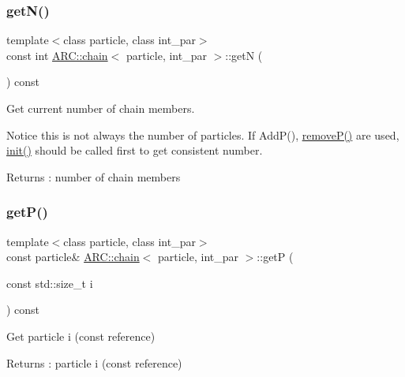 \subsubsection{\texorpdfstring{get\+N()}{getN()}}
{\footnotesize\ttfamily template$<$class particle, class int\+\_\+par$>$ \\
const int \hyperlink{classARC_1_1chain}{A\+R\+C\+::chain}$<$ particle, int\+\_\+par $>$\+::getN (\begin{DoxyParamCaption}{ }\end{DoxyParamCaption}) const\hspace{0.3cm}{\ttfamily [inline]}}



Get current number of chain members. 

Notice this is not always the number of particles. If Add\+P(), \hyperlink{classARC_1_1chain_a450a7459b076331b6aaa888d209e888c}{remove\+P()} are used, \hyperlink{classARC_1_1chain_a3fe37720ceb48c14905c92d3e25e71a4}{init()} should be called first to get consistent number. \begin{DoxyReturn}{Returns}
\+: number of chain members 
\end{DoxyReturn}
\hypertarget{classARC_1_1chain_ad8bacf5ad6ea0bb31bdb457e4c626701}{}\label{classARC_1_1chain_ad8bacf5ad6ea0bb31bdb457e4c626701} 
\subsubsection{\texorpdfstring{get\+P()}{getP()}}
{\footnotesize\ttfamily template$<$class particle, class int\+\_\+par$>$ \\
const particle\& \hyperlink{classARC_1_1chain}{A\+R\+C\+::chain}$<$ particle, int\+\_\+par $>$\+::getP (\begin{DoxyParamCaption}\item[{const std\+::size\+\_\+t}]{i }\end{DoxyParamCaption}) const\hspace{0.3cm}{\ttfamily [inline]}}



Get particle i (const reference) 

\begin{DoxyReturn}{Returns}
\+: particle i (const reference) 
\end{DoxyReturn}
\hypertarget{classARC_1_1chain_a992795e009faf43b59fc338350ae210c}{}\label{classARC_1_1chain_a992795e009faf43b59fc338350ae210c} 
